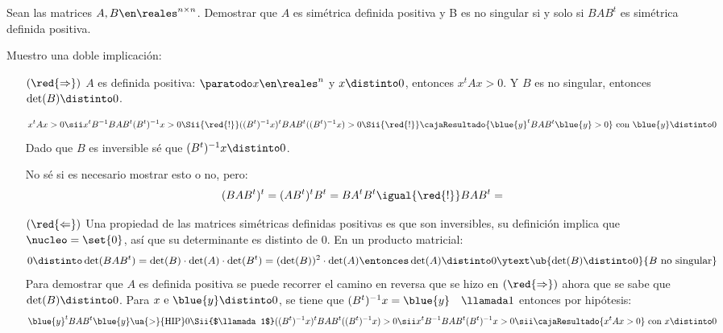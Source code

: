 \begin{enunciado}{\ejercicio}
  Sean las matrices $A, B \en \reales^{n \times n}$. Demostrar que $A$ es simétrica definida positiva y B
  es no singular si y solo si $BAB^t$ es simétrica definida positiva.
\end{enunciado}
Muestro una doble implicación:
\begin{itemize}
  \item[$(\red{\Rightarrow})$]
        $A$ es definida positiva:
        $\paratodo x \en \reales^n$ y  $x \distinto 0$, entonces $x^t A x > 0 $. Y $B$ es no singular, entonces $\det(B) \distinto 0$.

        $$
          x^t A x > 0
          \sii
          x^tB^{-1}B A B^t(B^t)^{-1} x > 0
          \Sii{\red{!}}
          ((B^t)^{-1}x)^tB A B^t ((B^t)^{-1} x) > 0
          \Sii{\red{!}}
          \cajaResultado{
            \blue{y}^tB A B^t \blue{y} > 0
          }
          \text{ con } \blue{y} \distinto 0
        $$
        Dado que $B$ es inversible sé que $(B^t)^{-1}x \distinto 0$.

        No sé si es necesario mostrar esto o no, pero:
        $$
          (BAB^t)^t =
          (AB^t)^tB^t
          =
          BA^tB^t
          \igual{\red{!}}
          BAB^t =
        $$

  \item[$(\red{\Leftarrow})$]
        Una propiedad de las matrices simétricas definidas positivas es que son inversibles,
        su definición implica que $\nucleo = \set{0}$, así que su determinante es distinto de 0.
        En un producto matricial:
        $$
          0 \distinto \det(B A B^t) =
          \det(B) \cdot \det(A) \cdot \det(B^t) =
          (\det(B))^2 \cdot \det(A)
          \entonces
          \det(A) \distinto 0  \ytext \ub{\det(B) \distinto 0}{B \text{ no singular}}
        $$
        Para demostrar que $A$ es definida positiva se puede recorrer el camino en reversa que se hizo en $(\red{\Rightarrow})$ ahora
        que se sabe que $\det(B) \distinto 0$. Para $x \text{ e } \blue{y} \distinto 0$, se tiene que $(B^t)^{-1} x = \blue{y}\quad \llamada1$ entonces por hipótesis:
        $$
          \blue{y}^tB A B^t \blue{y} \ua{>}{\text{HIP}} 0
          \Sii{$\llamada1$}
          ((B^t)^{-1}x)^tB A B^t ((B^t)^{-1} x) > 0
          \sii
          x^t B^{-1}B A B^t(B^t)^{-1} x > 0
          \sii
          \cajaResultado{
            x^t A x > 0
          } \text{ con } x \distinto 0
        $$
\end{itemize}

\begin{aportes}
  \item {}
\end{aportes}
